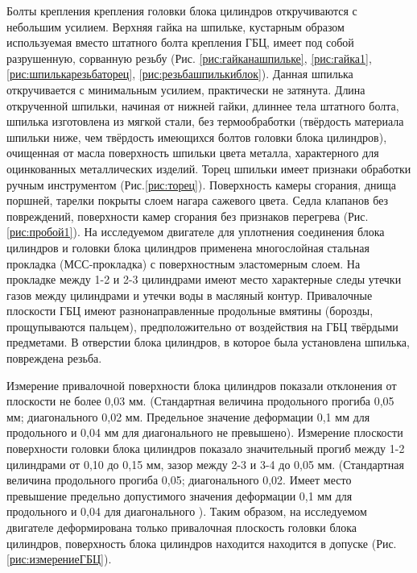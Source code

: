 Болты крепления крепления головки блока цилиндров откручиваются с небольшим усилием. Верхняя гайка на шпильке,  кустарным образом используемая вместо штатного болта крепления ГБЦ, имеет под собой разрушенную, сорванную резьбу (Рис. \ref{рис:гайканашпильке}, \ref{рис:гайка1}, \ref{рис:шпилькарезьбаторец}, \ref{рис:резьбашпилькиблок}). Данная шпилька откручивается с минимальным усилием, практически не затянута. Длина  открученной шпильки, начиная от нижней гайки, длиннее тела штатного болта,  шпилька изготовлена из мягкой стали, без термообработки (твёрдость материала шпильки ниже, чем твёрдость имеющихся болтов  головки блока цилиндров), очищенная от масла поверхность шпильки  цвета металла, характерного для оцинкованных металлических изделий. Торец шпильки имеет признаки обработки ручным инструментом (Рис.\ref{рис:торец}). 
Поверхность камеры сгорания, днища поршней, тарелки покрыты слоем  нагара сажевого цвета. Седла клапанов без повреждений, поверхности камер сгорания без признаков перегрева (Рис.\ref{рис:пробой1}). 
На исследуемом двигателе для уплотнения соединения блока цилиндров и головки блока цилиндров применена многослойная стальная прокладка (МСС-прокладка) с поверхностным эластомерным слоем. На прокладке между 1-2 и 2-3 цилиндрами имеют место характерные следы утечки газов между цилиндрами и утечки воды в масляный контур. Привалочные плоскости ГБЦ имеют разнонаправленные продольные вмятины (борозды, прощупываются пальцем), предположительно от воздействия на ГБЦ твёрдыми предметами. В отверстии  блока цилиндров, в которое была установлена шпилька, повреждена резьба.%

Измерение привалочной поверхности блока цилиндров показали отклонения от плоскости не более 0,03 мм. (Стандартная величина продольного прогиба 0,05 мм; диагонального 0,02 мм. Предельное значение деформации 0,1 мм для продольного и 0,04 мм для диагонального не превышено).  Измерение плоскости   поверхности  головки блока цилиндров показало значительный прогиб  между 1-2 цилиндрами от 0,10 до 0,15 мм, зазор  между 2-3 и 3-4 до  0,05 мм.  (Стандартная величина продольного прогиба 0,05; диагонального 0,02. Имеет место превышение предельно допустимого значения  деформации 0,1 мм для продольного и 0,04 для диагонального ). Таким образом, на исследуемом двигателе деформирована только привалочная плоскость головки блока цилиндров, поверхность блока цилиндров находится находится в допуске (Рис. \ref{рис:измерениеГБЦ}). 

